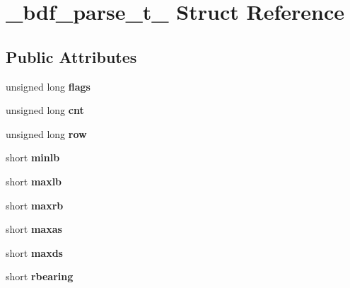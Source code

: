 \hypertarget{struct__bdf__parse__t__}{}\section{\+\_\+bdf\+\_\+parse\+\_\+t\+\_\+ Struct Reference}
\label{struct__bdf__parse__t__}
\subsection*{Public Attributes}
\begin{DoxyCompactItemize}
\item 
\mbox{\label{struct__bdf__parse__t___a6b542a4fbc88c16d9ed9bf3a411cab3b}} 
unsigned long {\bfseries flags}
\item 
\mbox{\label{struct__bdf__parse__t___a5b04ea4c7b7217a49ec9b3acf40e6e15}} 
unsigned long {\bfseries cnt}
\item 
\mbox{\label{struct__bdf__parse__t___aad65e1b83bcdb3cdc7e7a277b8294590}} 
unsigned long {\bfseries row}
\item 
\mbox{\label{struct__bdf__parse__t___a723f13d25c321ecf08ebdacbbc21c4df}} 
short {\bfseries minlb}
\item 
\mbox{\label{struct__bdf__parse__t___a5d16e1b687ad6f596a552a13531a8157}} 
short {\bfseries maxlb}
\item 
\mbox{\label{struct__bdf__parse__t___a3570ced872e6588430c9402b6ab5390f}} 
short {\bfseries maxrb}
\item 
\mbox{\label{struct__bdf__parse__t___a036f466e7b3415dabac8b25946985c09}} 
short {\bfseries maxas}
\item 
\mbox{\label{struct__bdf__parse__t___a133150b5871fe65f9a478cde988cdaa0}} 
short {\bfseries maxds}
\item 
\mbox{\label{struct__bdf__parse__t___a7f8f18be68f734a025894a2965e10d39}} 
short {\bfseries rbearing}
\item 

\end{DoxyCompactItemize}
